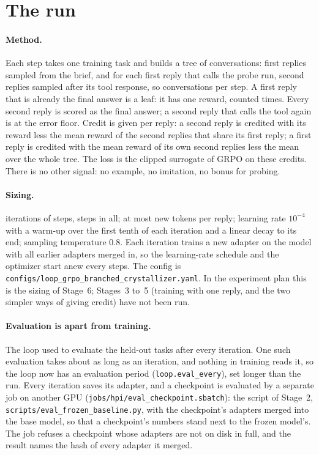 \documentclass[11pt,a4paper]{article}
\begin{document}
\section{The run}

\paragraph{Method.} Each step takes one training task and builds a tree of
conversations: \TRgone{} first replies sampled from the brief, and for each
first reply that calls the probe run, \TRgtwo{} second replies sampled after
its tool response, so \TRconversations{} conversations per step. A first
reply that is already the final answer is a leaf: it has one reward, counted
\TRgtwo{} times. Every second reply is scored as the final answer; a second
reply that calls the tool again is at the error floor. Credit is given per
reply: a second reply is credited with its reward less the mean reward of
the \TRgtwo{} second replies that share its first reply; a first reply is
credited with the mean reward of its own second replies less the mean over
the whole tree. The loss is the clipped surrogate of GRPO on these credits.
There is no other signal: no example, no imitation, no bonus for probing.

\paragraph{Sizing.} \TRiterations{} iterations of \TRstepsperiteration{}
steps, \TRsteps{} steps in all; at most \TRmaxturntokens{} new tokens per
reply; learning rate $10^{-4}$ with a warm-up over the first tenth of each
iteration and a linear decay to its end; sampling temperature 0.8. Each
iteration trains a new adapter on the model with all earlier adapters merged
in, so the learning-rate schedule and the optimizer start anew every
\TRstepsperiteration{} steps. The config is
\texttt{configs/loop\_grpo\_branched\_crystallizer.yaml}. In the experiment
plan this is the sizing of Stage~6; Stages~3 to~5 (training with one reply,
and the two simpler ways of giving credit) have not been run.

\paragraph{Evaluation is apart from training.} The loop used to evaluate
the held-out tasks after every iteration. One such evaluation takes about as
long as an iteration, and nothing in training reads it, so the loop now has
an evaluation period (\texttt{loop.eval\_every}), set longer than the run.
Every iteration saves its adapter, and a checkpoint is evaluated by a
separate job on another GPU (\texttt{jobs/hpi/eval\_checkpoint.sbatch}):
the script of Stage~2, \texttt{scripts/eval\_frozen\_baseline.py}, with the
checkpoint's adapters merged into the base model, so that a checkpoint's
numbers stand next to the frozen model's. The job refuses a checkpoint whose
adapters are not on disk in full, and the result names the hash of every
adapter it merged.
\end{document}
